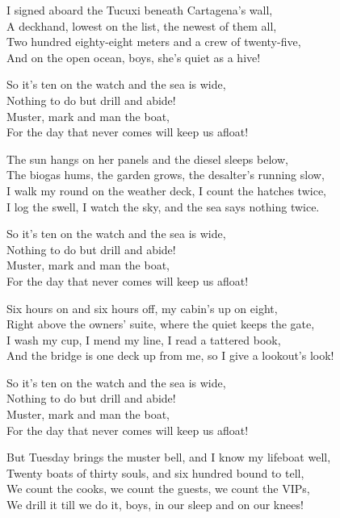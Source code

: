 \begin{lyrics}
I signed aboard the Tucuxi beneath Cartagena’s wall,\\
A deckhand, lowest on the list, the newest of them all,\\
Two hundred eighty-eight meters and a crew of twenty-five,\\
And on the open ocean, boys, she’s quiet as a hive!

So it’s ten on the watch and the sea is wide,\\
Nothing to do but drill and abide!\\
Muster, mark and man the boat,\\
For the day that never comes will keep us afloat!

The sun hangs on her panels and the diesel sleeps below,\\
The biogas hums, the garden grows, the desalter’s running slow,\\
I walk my round on the weather deck, I count the hatches twice,\\
I log the swell, I watch the sky, and the sea says nothing twice.

So it’s ten on the watch and the sea is wide,\\
Nothing to do but drill and abide!\\
Muster, mark and man the boat,\\
For the day that never comes will keep us afloat!

Six hours on and six hours off, my cabin’s up on eight,\\
Right above the owners’ suite, where the quiet keeps the gate,\\
I wash my cup, I mend my line, I read a tattered book,\\
And the bridge is one deck up from me, so I give a lookout’s look!

So it’s ten on the watch and the sea is wide,\\
Nothing to do but drill and abide!\\
Muster, mark and man the boat,\\
For the day that never comes will keep us afloat!

But Tuesday brings the muster bell, and I know my lifeboat well,\\
Twenty boats of thirty souls, and six hundred bound to tell,\\
We count the cooks, we count the guests, we count the VIPs,\\
We drill it till we do it, boys, in our sleep and on our knees!


\end{lyrics}
